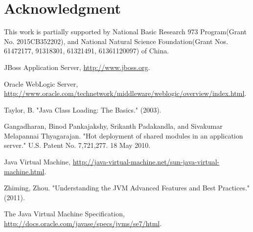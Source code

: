 \documentclass[conference]{IEEEtran}
\begin{document}
\section*{Acknowledgment}
This work is partially supported by National Basic Research 973 Program(Grant No. 2015CB352202), and National Natural Science Foundation(Grant Nos. 61472177, 91318301, 61321491, 61361120097) of China.




\begin{thebibliography}{9}


JBoss Application Server, \url{http://www.jboss.org}.

Oracle WebLogic Server, \url{http://www.oracle.com/technetwork/middleware/weblogic/overview/index.html}.


Taylor, B. "Java Class Loading: The Basics." (2003).

Gangadharan, Binod Pankajakshy, Srikanth Padakandla, and Sivakumar Melapannai Thyagarajan. "Hot deployment of shared modules in an application server." U.S. Patent No. 7,721,277. 18 May 2010.



Java Virtual Machine, \url{http://java-virtual-machine.net/sun-java-virtual-machine.html}.

Zhiming, Zhou. "Understanding the JVM Advanced Features and Best Practices." (2011).

The Java Virtual Machine Specification, \url{http://docs.oracle.com/javase/specs/jvms/se7/html}.


\end{thebibliography}
\end{document}
